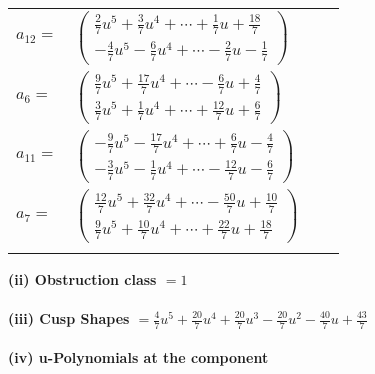 \documentclass[1p]{elsarticle_modified}
\theoremstyle{definition}
\begin{document}
\begin{tabular}{m{7pt} m{180pt} m{7pt} m{180pt} }
\flushright $a_{12}=$&$\begin{pmatrix}\frac{2}{7} u^5+\frac{3}{7} u^4+\cdots+\frac{1}{7} u+\frac{18}{7}\\-\frac{4}{7} u^5-\frac{6}{7} u^4+\cdots-\frac{2}{7} u-\frac{1}{7}\end{pmatrix}$ \\
\flushright $a_{6}=$&$\begin{pmatrix}\frac{9}{7} u^5+\frac{17}{7} u^4+\cdots-\frac{6}{7} u+\frac{4}{7}\\\frac{3}{7} u^5+\frac{1}{7} u^4+\cdots+\frac{12}{7} u+\frac{6}{7}\end{pmatrix}$ \\
\flushright $a_{11}=$&$\begin{pmatrix}-\frac{9}{7} u^5-\frac{17}{7} u^4+\cdots+\frac{6}{7} u-\frac{4}{7}\\-\frac{3}{7} u^5-\frac{1}{7} u^4+\cdots-\frac{12}{7} u-\frac{6}{7}\end{pmatrix}$ \\
\flushright $a_{7}=$&$\begin{pmatrix}\frac{12}{7} u^5+\frac{32}{7} u^4+\cdots-\frac{50}{7} u+\frac{10}{7}\\\frac{9}{7} u^5+\frac{10}{7} u^4+\cdots+\frac{22}{7} u+\frac{18}{7}\end{pmatrix}$\\&\end{tabular}
\flushleft \textbf{(ii) Obstruction class $= 1$}\\~\\
\flushleft \textbf{(iii) Cusp Shapes $= \frac{4}{7} u^5+\frac{20}{7} u^4+\frac{20}{7} u^3-\frac{20}{7} u^2-\frac{40}{7} u+\frac{43}{7}$}\\~\\
\newpage\renewcommand{\arraystretch}{1}
\flushleft \textbf{(iv) u-Polynomials at the component}\newline \\
\end{document}
